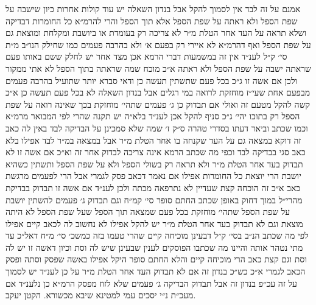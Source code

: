\documentclass[12pt, openany]{book}
\begin{document}
\begin{multicols}{2}
אמנם על זה לבד אין לסמוך להקל אבל בנדון השאלה יש עוד קולות אחרות כיון שישבה על שפת הספל ולא ראתה על שפת הספל אלא תוך הספל והרי להרמ״א כל החומרות דבדיקה ושלא תראה על העד אחר הטלת מ״ר לא צריכה רק בעומדת או ביושבת ומקלחת ומוצאת גם על שפת הספל ואף דהרמ״א לא איירי רק בפעם א׳ ולא בהרבה פעמים כמו שחילק הנו״ב מ״ת סי׳ ק״ל לענ״ד אין זה במשמעות דברי הרמא אכן מצד אחר יש לחלק ששם באותו פעם שראתה ישבה על שפת הספל ולא ראתה א״כ מוכח שמה שראתה בתוך הספל לא אתי ממקור ולכן אם אשה זו ג״כ בכל פעם שתשתין תעשה כן ודאי סברא יותר שתועיל בהרבה פעמים מבפעם אחת שעי״ז מוחזקת לרואה במי רגלים אבל בנדון השאלה לא בכל פעם תעשה כן א״כ קשה להקל מטעם זה ואולי אם תבדוק כן ג׳ פעמים שתהי׳ מוחזקת בכך שאינה רואה על שפת הספל רק בתוכו יהי׳ ג״כ סניף להקל אכן לענ״ד בלא״ה יש תקנה שהרי לפי המבואר מרמ״א וכמו שכתב וביאר דעתו בסדרי טהרה ס״ק ז׳ שמה שלא סמכינן על הבדיקה לבד באין לה כאב זה דוקא במצאה גם על העד שקנחה בו אחר הטלת מ״ר אבל במצאה במ״ר לבד אפילו בלא כאב סגי בבדיקה לבד וכפי מה שכתב הרמא אינה צריכה לבדוק אחר זה וא״כ אם אשה זו לא תבדוק בעד אחר הטלת מ״ר ולא תראה רק בשולי הספל ולא על שפת הספל ותשתין כשהיא יושבת הרי יוצאת כל החומרות אפילו אם נאמר דכאב פסק לגמרי אבל הרי לפעמים מרגשת כאב א״כ זה הוכחה קצת שעדיין לא נתרפאה מכתה ולכן לענ״ד אם אשה זו תבדוק בבדיקת מהרי״ל במוך דחוק באופן שכתב החתם סופר סי׳ קמ״ח וגם תבדוק ג׳ פעמים להשתין יושבת על שפת הספל שתהי׳ מוחזקת בכל פעם שמצאה תוך הספל שעל שפת הספל לא היתה מוצאת וגם לא תבדוק בעד אחר הטלת מ״ר יש להקל אפילו לא נחשוב לה לכאב קיים אפילו לפי מה שכתב הנ״ב בסי׳ ק״ל דבעינן מוכיחה קיים שהרי טעמו בזה כמשכ׳ סי׳ מ״ח דאל״כ עד מתי נטהר אותה והיינו מה שכתבו הפוסקים לענין שבעינן שיש לה וסת וכיון דאשה זו יש לה וסת וגם קצת כאב הרי מוכיחה קיים והלא החתם סופר היקל אפילו באשה שפסק וסתה ופסק הכאב לגמרי א״כ כש״כ בנדון זה אם לא תבדוק העד אחר הטלת מ״ר על כן לענ״ד יש לסמוך על זה עכ״פ בנדון זה אבל תבדוק הבדיקה ג׳ פעמים שלא לזוז מפסק הרמ״א כן נלענ״ד אם מעכ״ת נ״י יסכים עמי למטינא שיבא מכשורא. הקטן יעקב.\\\vspace{0pt}

\end{multicols}\newpage
\end{document}
